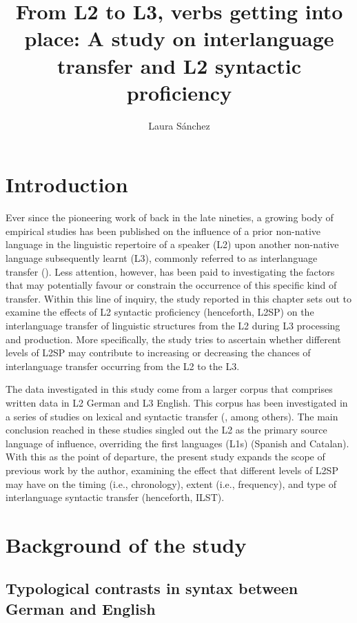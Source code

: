 \documentclass[output=paper,modfonts,nonflat, newtxmath]{langsci/langscibook}
\author{Laura Sánchez\affiliation{Stockholm University}}
\title{From L2 to L3, verbs getting into place: A study on interlanguage transfer and L2 syntactic proficiency}
\begin{document}
\maketitle


\section{Introduction}
Ever since the pioneering work of \citet{WilliamsHammarberg1998} back in the late nineties, a growing body of empirical studies has been published on the influence of a prior non-native language in the linguistic repertoire of a speaker (L2) upon another non-native language subsequently learnt (L3), commonly referred to as {interlanguage} {transfer} (\citealt{DeAngelisSelinker2001}). Less attention, however, has been paid to investigating the factors that may potentially favour or constrain the occurrence of this specific kind of transfer. Within this line of inquiry, the study reported in this chapter sets out to examine the effects of L2 syntactic proficiency (henceforth, L2SP) on the interlanguage transfer of linguistic structures from the L2 during L3 processing and production. More specifically, the study tries to ascertain whether different levels of L2SP may contribute to increasing or decreasing the chances of interlanguage transfer occurring from the L2 to the L3.

The data investigated in this study come from a larger corpus that comprises written data in L2 German and L3 English. This corpus has been investigated in a series of studies on lexical \citep{Sánchez2015L2} and syntactic transfer (\citealt{Sánchez2012, Sánchez2015Background}, among others). The main conclusion reached in these studies singled out the L2 as the primary source language of influence, overriding the first languages (L1s) (Spanish and Catalan). With this as the point of departure, the present study expands the scope of previous work by the author, examining the effect that different levels of L2SP may have on the {timing} (i.e., chronology), {extent} (i.e., frequency), and {type} of interlanguage syntactic transfer (henceforth, ILST).

\section{Background of the study}\label{sec:sanchez7:2}

\subsection{Typological contrasts in syntax between German and English}\label{sec:sanchez7:2.1}
\end{document}
